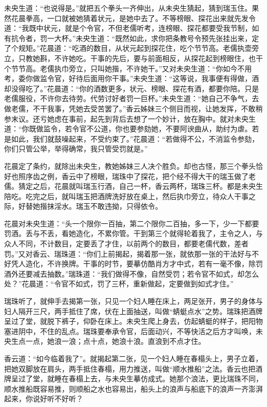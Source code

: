 \documentclass[a4paper,12pt,UTF8,twoside]{ctexbook}
\begin{document}
未央生道：“也说得是。”就把五个拳头一齐伸出，从未央生猜起，猜到瑞玉住。果然花晨拳高，一口就被她猜着状元，是她中去了。不等榜眼、探花出来就先发令道：“我既中状元，就是个令官，不但老儒听考，连榜眼、探花都要受我节制，如有抗令者，罚一大杯。”未央生道：“既然如此，求你把条教号令预先张挂出来，定了个规矩。”花晨道：“吃酒的数目，从状元起到探花住，吃个节节高。老儒执壶旁立，只教她斟，不许她吃。干事的先后，要与前面相反，从探花起到榜眼住，也干个节节高。老儒执巾旁立，只叫她揩，不许她干。”又对未央生道：“你如今不用考，委你做监令官，好待后面用你干事。”未央生道：“这等说，我事便有得做，酒却没得吃了。”花晨道：“你的酒数更多，状元、榜眼、探花有酒，都要你陪。只是老儒服役，不许你去待劳。代劳讨好者罚一巨杯。”未央生道：“她自己不争气，去做老儒，不干我事，凭她去受苦罢了。”香云姊妹三个侧目而视，让她发挥，不敢稍参末议。还亏她虑在事前，起先到背后去想了一个妙计，放在胸中。就对未央生道：“你既做监令，若令官不公道，你也要参劾她，不要阿谀曲从，助纣为虐。若是如此，我们就鼓噪起来，不受约束了。”花晨道：“若做得不公，不消监令参劾，你们只管公举，举得确常，我只管受罚就是。”

花晨定了条约，就除出未央生，教她姊妹三人决个胜负。却也古怪，那三个拳头恰好也照序齿之例，香云中了榜眼，瑞珠中了探花，把个经不得大干的瑞玉做了老儒。猜定之后，花晨就叫瑞玉行酒，自己一杯，香云两杯，瑞珠三杯。都是未央生陪吃。吃完之后，就叫瑞玉把酒牌洗好放在桌上，然后执巾旁立，待众人干事之际，好替她揩抹淫水。瑞玉不敢违拗，只得依令。

花晨对未央生道：“头一个限你一百抽，第二个限你二百抽，多一下，少一下都要罚酒。丢与不丢，看她造化，不累你管。干到第三个就得轮着我了，主令之人，与众人不同，不计数目，定要丢了才住，以前两个的数目，都要老儒代数，差者罚。”又对香云、瑞珠道：“你们上前揭起，揭着那一张，就依那一张的干法好与不好凭人造化，不许换牌。干事的时节，要摹仿酷肖方才中式，若有一毫不像，除罚酒外还要减去抽数。”瑞珠道：“我们做得不像，自然受罚；若令官不如式，却怎么处？”花晨道：“令官不如式，罚了三杯，重新做起，定要做到如式才住。”

瑞珠听了，就伸手去揭第一张，只见一个妇人睡在床上，两足张开，男子的身体与妇人隔开三尺，两手抵住了席，伏在上面抽送，叫做“蜻蜓点水”之势。瑞珠把酒牌呈过了堂，就脱下裤子，仰卧在床上。未央生爬上身去，仿起蜻蜓的样子，把阳物塞进阴中，不住的乱点。瑞珠要奉承令官，后面动兴，不等快活之后方才叫唤，未央生点一点，她浪一浪；点十点，她浪十浪。直浪到不点才住。

香云道：“如今临着我了”。就揭起第二张，见一个妇人睡在春榻头上，男子立着，把她双脚放在肩头，两手抵住春榻，用力推送，叫做“顺水推船”之法。香云也把酒牌呈过了堂，就睡在春榻上去，与未央生摹仿成式。她那个浪法，更比瑞珠不同，顺水推船既容易推，则顺船之水也容易出，船头上的浪声与船底下的浪声一齐澎湃起来，你说好听不好听？
\end{document}
